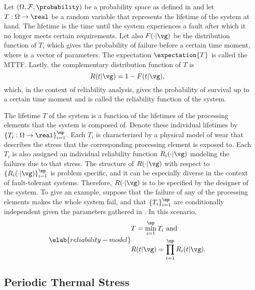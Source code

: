 \newcommand{\mean}{\mu}
\newcommand{\scale}{\eta}
\newcommand{\shape}{\beta}

Let $(\Omega, \mathcal{F}, \probability)$ be a probability space as defined in
 and let $T: \Omega \to \real$ be a random variable
that represents the lifetime of the system at hand. The lifetime is the time
until the system experiences a fault after which it no longer meets certain
requirements. Let also $F(\cdot | \vg)$ be the distribution function of $T$,
which gives the probability of failure before a certain time moment, where \vg
is a vector of parameters. The expectation $\expectation{T}$ is called the
\ac{MTTF}. Lastly, the complementary distribution function of $T$ is
\[
  R(t | \vg) = 1 - F(t | \vg),
\]
which, in the context of reliability analysis, gives the probability of survival
up to a certain time moment and is called the reliability function of the
system.

The lifetime $T$ of the system is a function of the lifetimes of the \np
processing elements that the system is composed of. Denote these individual
lifetimes by $\{ T_i: \Omega \to \real \}_{i = 1}^\np$. Each $T_i$ is
characterized by a physical model of wear \cite{jedec2016} that describes the
stress that the corresponding processing element is exposed to. Each $T_i$ is
also assigned an individual reliability function $R_i(\cdot | \vg)$ modeling the
failures due to that stress. The structure of $R(\cdot | \vg)$ with respect to
$\{ R_i(\cdot | \vg) \}_{i = 1}^\np$ is problem specific, and it can be
especially diverse in the context of fault-tolerant systems. Therefore, $R(\cdot
| \vg)$ is to be specified by the designer of the system. To give an example,
suppose that the failure of any of the \np processing elements makes the whole
system fail, and that $\{ T_i \}_{i = 1}^\np$ are conditionally independent
given the parameters gathered in \vg. In this scenario,
\begin{equation} \elab{reliability-model}
  \begin{split}
    & T = \min_{i = 1}^\np T_i \text{ and} \\
    & R(t | \vg) = \prod_{i = 1}^\np R_i(t | \vg).
  \end{split}
\end{equation}

\subsection{Periodic Thermal Stress}

